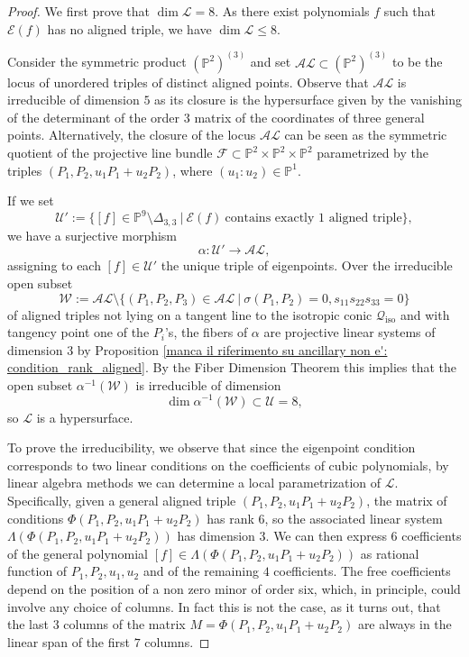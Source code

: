 \documentclass{amsart}
\theoremstyle{plain}
\theoremstyle{definition}
\newcommand{\p}{\mathbb{P}}
\newcommand{\sL}{\mathcal{L}}
\newcommand{\sU}{\mathcal{U}}
\newcommand{\sF}{\mathcal{F}}
\newcommand{\iso}{\mathcal{Q}_{\mathrm{iso}}}
\newcommand{\Eig}[1]{\mathcal{E}\!\left( {#1} \right)}
\begin{document}
\begin{proof}
We first prove that $\dim \mathcal{L}=8$. As there exist
polynomials $f$ such that $\Eig{f}$ has no aligned triple, we have $\dim \mathcal{L} \le 8$.


Consider the symmetric product $(\p^2) ^{(3)}$ and set $\mathcal {AL} \subset (\p^2) ^{(3)}$ to be the locus of unordered triples of distinct aligned points. Observe that $\mathcal {AL}$ is irreducible of dimension $5$ as its closure is the hypersurface given by the vanishing of the determinant of the order $3$ matrix of the coordinates of three general points. Alternatively, the closure of the locus $\mathcal {AL}$ can be seen as the symmetric quotient of the projective line bundle $\sF \subset \p^2 \times \p^2 \times \p^2$ parametrized by the triples $(P_1, P_2, u_1 P_1 +u_2P_2)$, where $(u_1:u_2) \in \p^1$.

If we set
$$
\sU':= \{[f]\in \p^9 \setminus \Delta_{3,3} \ | \ \Eig{f} \ \textrm {contains \ exactly \ $1$ \ aligned \ triple}\},
$$
we have a surjective morphism
$$
\alpha : \mathcal{U}' \to \mathcal {AL},
$$
assigning to each $[f] \in \mathcal{U}'$ the unique triple of eigenpoints. Over the irreducible open subset
$$
\mathcal W := \mathcal {AL}
\setminus \{(P_1,P_2,P_3)\in\mathcal {AL}
\ | \ \sigma(P_1,P_2)=0, s_{11} s_{22} s_{33}=0\}
$$
of aligned triples not lying
on a tangent line to the isotropic conic $\iso$ and with tangency point one of the $P_i$'s, the fibers of $\alpha$ are projective linear systems of dimension $3$ by
Proposition \ref{manca il riferimento su ancillary  non e': condition_rank_aligned}. By the Fiber Dimension Theorem this implies that the open subset $\alpha ^{-1} (\mathcal W)$ is irreducible of dimension
$$
\dim \alpha ^{-1} (\mathcal W)
\subset \sU=8 ,
$$
so $\sL$ is a hypersurface.


To prove the irreducibility, we observe that since the eigenpoint condition corresponds to two linear conditions on the coefficients of cubic polynomials, by linear algebra methods we can determine a local parametrization of $\sL$.
Specifically, given a general aligned triple $(P_1, P_2, u_1 P_1 +u_2P_2)$, the matrix of conditions $\Phi(P_1, P_2, u_1 P_1 +u_2P_2)$ has rank $6$, so the associated linear system
$\Lambda (\Phi(P_1, P_2, u_1 P_1 +u_2P_2))$ has dimension $3$. We can then express $6$ coefficients of the general polynomial
$[f]\in \Lambda (\Phi(P_1, P_2, u_1 P_1 +u_2P_2))$ as rational function of $P_1,P_2,u_1,u_2$ and of the remaining $4$ coefficients. The free coefficients depend on the position of a non zero minor of order six, which, in principle, could involve any choice of columns. In fact this is not the case, as it turns out, that the last $3$ columns of the matrix
$M = \Phi(P_1, P_2, u_1 P_1 +u_2P_2)$ are always in the linear span of the first $7$ columns.


\end{proof}
\end{document}
